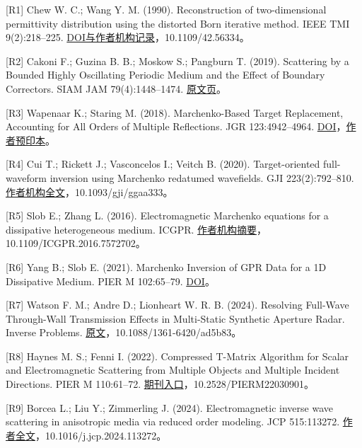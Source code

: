 \documentclass[
  10pt,
  a4paper,
]{article}
\begin{document}
{[}R1{]} Chew W. C.; Wang Y. M. (1990). Reconstruction of
two-dimensional permittivity distribution using the distorted Born
iterative method. IEEE TMI 9(2):218--225.
\href{https://hub.hku.hk/handle/10722/182506}{DOI与作者机构记录}，10.1109/42.56334。

{[}R2{]} Cakoni F.; Guzina B. B.; Moskow S.; Pangburn T. (2019).
Scattering by a Bounded Highly Oscillating Periodic Medium and the
Effect of Boundary Correctors. SIAM JAM 79(4):1448--1474.
\href{https://epubs.siam.org/doi/10.1137/19M1237089}{原文页}。

{[}R3{]} Wapenaar K.; Staring M. (2018). Marchenko-Based Target
Replacement, Accounting for All Orders of Multiple Reflections. JGR
123:4942--4964.
\href{https://doi.org/10.1029/2017JB015208}{DOI}，\href{https://arxiv.org/abs/1707.06580}{作者预印本}。

{[}R4{]} Cui T.; Rickett J.; Vasconcelos I.; Veitch B. (2020).
Target-oriented full-waveform inversion using Marchenko redatumed
wavefields. GJI 223(2):792--810.
\href{https://research-portal.uu.nl/ws/portalfiles/portal/235427686/ggaa333.pdf}{作者机构全文}，10.1093/gji/ggaa333。

{[}R5{]} Slob E.; Zhang L. (2016). Electromagnetic Marchenko equations
for a dissipative heterogeneous medium. ICGPR.
\href{https://research.tudelft.nl/en/publications/electromagnetic-marchenko-equations-for-a-dissipative-heterogeneo/}{作者机构摘要}，10.1109/ICGPR.2016.7572702。

{[}R6{]} Yang B.; Slob E. (2021). Marchenko Inversion of GPR Data for a
1D Dissipative Medium. PIER M 102:65--79.
\href{https://doi.org/10.2528/PIERM21020901}{DOI}。

{[}R7{]} Watson F. M.; Andre D.; Lionheart W. R. B. (2024). Resolving
Full-Wave Through-Wall Transmission Effects in Multi-Static Synthetic
Aperture Radar. Inverse Problems.
\href{https://arxiv.org/html/2403.10354v1}{原文}，10.1088/1361-6420/ad5b83。

{[}R8{]} Haynes M. S.; Fenni I. (2022). Compressed T-Matrix Algorithm
for Scalar and Electromagnetic Scattering from Multiple Objects and
Multiple Incident Directions. PIER M 110:61--72.
\href{https://www.jpier.org/issues/volume.html?paper=22030901}{期刊入口}，10.2528/PIERM22030901。

{[}R9{]} Borcea L.; Liu Y.; Zimmerling J. (2024). Electromagnetic
inverse wave scattering in anisotropic media via reduced order modeling.
JCP 515:113272.
\href{https://arxiv.org/html/2403.03844v1}{作者全文}，10.1016/j.jcp.2024.113272。
\end{document}
